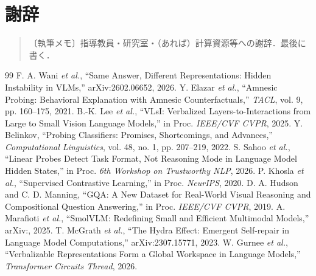 \documentclass[report]{jsbook}
\newcommand{\draftnote}[1]{%
  \begin{quote}\small〔執筆メモ〕#1\end{quote}}
\begin{document}
\tableofcontents

\mainmatter








\chapter*{謝辞}

\draftnote{指導教員・研究室・（あれば）計算資源等への謝辞．最後に書く．}

\begin{thebibliography}{99}
 F. A. Wani {\it et al.}, ``Same Answer, Different Representations: Hidden Instability in VLMs,'' arXiv:2602.06652, 2026.
 Y. Elazar {\it et al.}, ``Amnesic Probing: Behavioral Explanation with Amnesic Counterfactuals,'' {\it TACL}, vol. 9, pp. 160--175, 2021.
 B.-K. Lee {\it et al.}, ``VLsI: Verbalized Layers-to-Interactions from Large to Small Vision Language Models,'' in Proc. {\it IEEE/CVF CVPR}, 2025.
 Y. Belinkov, ``Probing Classifiers: Promises, Shortcomings, and Advances,'' {\it Computational Linguistics}, vol. 48, no. 1, pp. 207--219, 2022.
 S. Sahoo {\it et al.}, ``Linear Probes Detect Task Format, Not Reasoning Mode in Language Model Hidden States,'' in Proc. {\it 6th Workshop on Trustworthy NLP}, 2026.
 P. Khosla {\it et al.}, ``Supervised Contrastive Learning,'' in Proc. {\it NeurIPS}, 2020.
 D. A. Hudson and C. D. Manning, ``GQA: A New Dataset for Real-World Visual Reasoning and Compositional Question Answering,'' in Proc. {\it IEEE/CVF CVPR}, 2019.
 A. Marafioti {\it et al.}, ``SmolVLM: Redefining Small and Efficient Multimodal Models,'' arXiv:, 2025.
 T. McGrath {\it et al.}, ``The Hydra Effect: Emergent Self-repair in Language Model Computations,'' arXiv:2307.15771, 2023.
 W. Gurnee {\it et al.}, ``Verbalizable Representations Form a Global Workspace in Language Models,'' {\it Transformer Circuits Thread}, 2026.
\end{thebibliography}

\appendix

\end{document}

